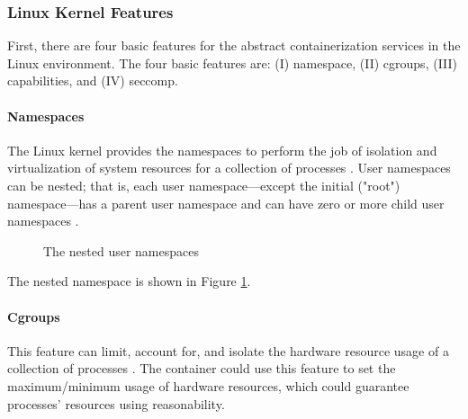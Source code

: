 \documentclass[12pt,a4paper]{article}
\begin{document}
\subsubsection{Linux Kernel Features}
First, there are four basic features for the abstract containerization services in the
Linux environment.
The four basic features are: (\RN{1}) namespace, (\RN{2}) cgroups, (\RN{3}) capabilities,
and (\RN{4}) seccomp.

\paragraph{Namespaces}
The Linux kernel provides the namespaces to perform the job of isolation and virtualization
of system resources for a collection of processes \cite{Road_Ahead}.
User namespaces can be nested; that is, each user namespace—except the initial ("root")
namespace—has a parent user namespace and can have zero or more child user namespaces
\cite{user_namespaces}.

\begin{figure}
  \centering
  \caption[]{The nested user namespaces}
  \label{Nested}

\end{figure}
The nested namespace is shown in Figure \ref*{Nested}.

\paragraph{Cgroups}
This feature can limit, account for, and isolate the hardware resource usage of a
collection of processes \cite{cgroup_wiki}.
The container could use this feature to set the maximum/minimum usage of hardware
resources, which could guarantee processes' resources using reasonability.
\end{document}

